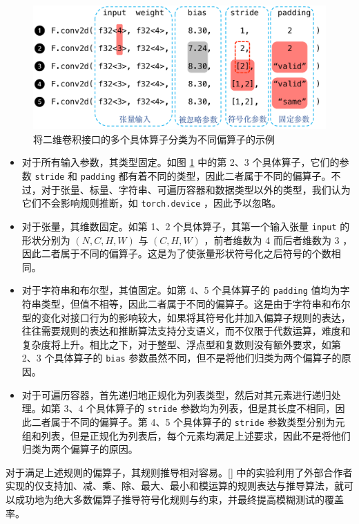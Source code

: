 \begin{figure}
    \centering
    \includegraphics[width=1.\linewidth]{thuthesis/figures/conv2d.pdf}
    \caption{将二维卷积接口的多个具体算子分类为不同偏算子的示例}
    \label{fig:conv2d}
\end{figure}

\begin{itemize}
    \item 对于所有输入参数，其类型固定。如图 \ref{fig:conv2d} 中的第 2、3 个具体算子，它们的参数 \texttt{stride} 和 \texttt{padding} 都有着不同的类型，因此二者属于不同的偏算子。不过，对于张量、标量、字符串、可遍历容器和数据类型以外的类型，我们认为它们不会影响规则推断，如 \texttt{torch.device} ，因此予以忽略。
    \item 对于张量，其维数固定。如第 1、2 个具体算子，其第一个输入张量 \texttt{input} 的形状分别为 $(N, C, H, W)$ 与 $(C, H, W)$ ，前者维数为 4 而后者维数为 3 ，因此二者属于不同的偏算子。这是为了使张量形状符号化之后符号的个数相同。
    \item 对于字符串和布尔型，其值固定。如第 4、5 个具体算子的 \texttt{padding} 值均为字符串类型，但值不相等，因此二者属于不同的偏算子。这是由于字符串和布尔型的变化对接口行为的影响较大，如果将其符号化并加入偏算子规则的表达，往往需要规则的表达和推断算法支持分支语义，而不仅限于代数运算，难度和复杂度将上升。相比之下，对于整型、浮点型和复数则没有额外要求，如第 2、3 个具体算子的 \texttt{bias} 参数虽然不同，但不是将他们归类为两个偏算子的原因。
    \item 对于可遍历容器，首先递归地正规化为列表类型，然后对其元素进行递归处理。如第 3、4 个具体算子的 \texttt{stride} 参数均为列表，但是其长度不相同，因此二者属于不同的偏算子。第 4、5 个具体算子的 \texttt{stride} 参数类型分别为元组和列表，但是正规化为列表后，每个元素均满足上述要求，因此不是将他们归类为两个偏算子的原因。
\end{itemize}

对于满足上述规则的偏算子，其规则推导相对容易。\ref{} 中的实验利用了外部合作者实现的仅支持加、减、乘、除、最大、最小和模运算的规则表达与推导算法，就可以成功地为绝大多数偏算子推导符号化规则与约束，并最终提高模糊测试的覆盖率。

